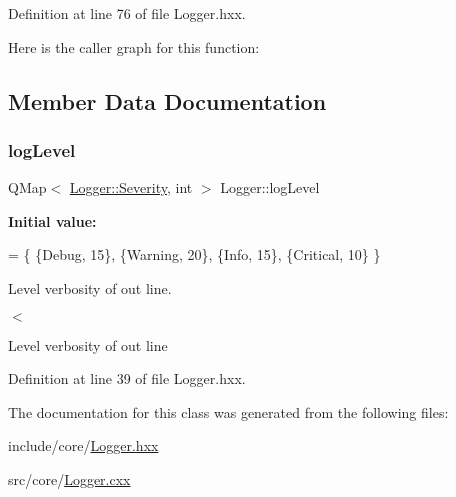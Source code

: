 Definition at line 76 of file Logger.\+hxx.

Here is the caller graph for this function\+:


\subsection{Member Data Documentation}
\mbox{\label{classeven_1_1_logger_aefbda568413248ac5d03fe072f30eea2}} 
\subsubsection{\texorpdfstring{log\+Level}{logLevel}}
{\footnotesize\ttfamily Q\+Map$<$ \mbox{\hyperlink{classeven_1_1_logger_adac430b7650d87ac25ace824917d66cf}{Logger\+::\+Severity}}, int $>$ Logger\+::log\+Level\hspace{0.3cm}{\ttfamily [static]}}

{\bfseries Initial value\+:}
\begin{DoxyCode}
= \{
    \{Debug, 15\},
    \{Warning, 20\},
    \{Info, 15\},
    \{Critical, 10\}
\}
\end{DoxyCode}


Level verbosity of out line. 

$<$

Level verbosity of out line 

Definition at line 39 of file Logger.\+hxx.



The documentation for this class was generated from the following files\+:\begin{DoxyCompactItemize}
\item 
include/core/\mbox{\hyperlink{_logger_8hxx}{Logger.\+hxx}}\item 
src/core/\mbox{\hyperlink{_logger_8cxx}{Logger.\+cxx}}\end{DoxyCompactItemize}
